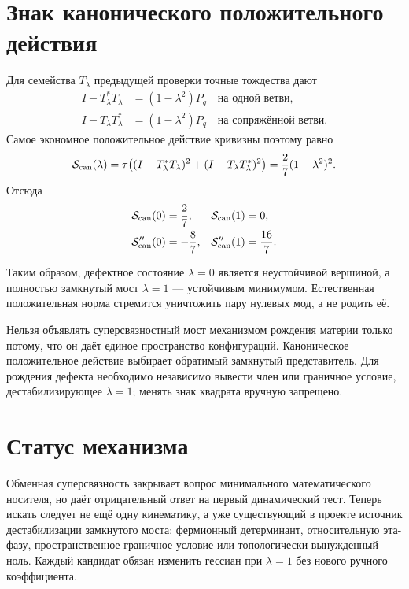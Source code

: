 \section{Знак канонического положительного действия}

Для семейства $T_\lambda$ предыдущей проверки точные тождества дают
\begin{align}
 I-T_\lambda^*T_\lambda&=(1-\lambda^2)P_q
 \quad\text{на одной ветви},\\
 I-T_\lambda T_\lambda^*&=(1-\lambda^2)P_q
 \quad\text{на сопряжённой ветви}.
\end{align}
Самое экономное положительное действие кривизны поэтому равно
\begin{equation}
 \mathcal S_{\rm can}(\lambda)
 =\tau\!\left((I-T_\lambda^*T_\lambda)^2
 +(I-T_\lambda T_\lambda^*)^2\right)
 =\frac{2}{7}(1-\lambda^2)^2.
 \label{eq:v6-canonical-bridge-action}
\end{equation}
Отсюда
\begin{align}
 \mathcal S_{\rm can}(0)&=\frac27,&
 \mathcal S_{\rm can}(1)&=0,\\
 \mathcal S_{\rm can}''(0)&=-\frac87,&
 \mathcal S_{\rm can}''(1)&=\frac{16}{7}.
\end{align}

Таким образом, дефектное состояние $\lambda=0$ является неустойчивой
вершиной, а полностью замкнутый мост $\lambda=1$ --- устойчивым минимумом.
Естественная положительная норма стремится уничтожить пару нулевых мод, а
не родить её.

\begin{nogocriterion}
Нельзя объявлять суперсвязностный мост механизмом рождения материи только
потому, что он даёт единое пространство конфигураций. Каноническое
положительное действие выбирает обратимый замкнутый представитель. Для
рождения дефекта необходимо независимо вывести член или граничное условие,
дестабилизирующее $\lambda=1$; менять знак квадрата вручную запрещено.
\end{nogocriterion}

\section{Статус механизма}

Обменная суперсвязность закрывает вопрос минимального математического
носителя, но даёт отрицательный ответ на первый динамический тест. Теперь
искать следует не ещё одну кинематику, а уже существующий в проекте источник
дестабилизации замкнутого моста: фермионный детерминант, относительную
эта-фазу, пространственное граничное условие или топологически вынужденный
ноль. Каждый кандидат обязан изменить гессиан при $\lambda=1$ без нового
ручного коэффициента.

